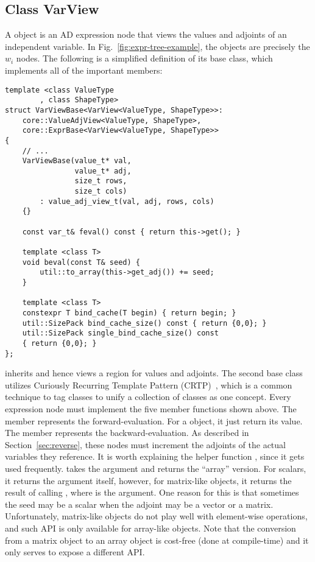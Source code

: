 \subsection{Class VarView}\label{ssec:var_view}

A  object is an AD expression node
that views the values and adjoints of an independent variable.
In Fig.~\ref{fig:expr-tree-example}, the  objects are precisely the $w_i$ nodes.
The following is a simplified definition of its base class, 
which implements all of the important members:
\begin{lstlisting}[style=customcpp]
template <class ValueType
        , class ShapeType>
struct VarViewBase<VarView<ValueType, ShapeType>>:
    core::ValueAdjView<ValueType, ShapeType>,
    core::ExprBase<VarView<ValueType, ShapeType>>
{
    // ...
    VarViewBase(value_t* val,
                value_t* adj,
                size_t rows,
                size_t cols)
        : value_adj_view_t(val, adj, rows, cols)
    {}

    const var_t& feval() const { return this->get(); }

    template <class T>
    void beval(const T& seed) { 
        util::to_array(this->get_adj()) += seed; 
    }

    template <class T>
    constexpr T bind_cache(T begin) { return begin; }
    util::SizePack bind_cache_size() const { return {0,0}; }
    util::SizePack single_bind_cache_size() const 
    { return {0,0}; }
};
\end{lstlisting}

 inherits  and hence views
a region for values and adjoints.
The second base class  utilizes Curiously Recurring Template Pattern (CRTP)~\cite{abrahams:2005},
which is a common technique to tag classes to unify a collection of classes as one concept.
Every expression node must implement the five member functions shown above.
The member  represents the forward-evaluation.
For a  object, it just return its value.
The member  represents the backward-evaluation.
As described in Section~\ref{sec:reverse}, 
these nodes must increment the adjoints of the actual variables they reference.
It is worth explaining 
the helper function ,
since it gets used frequently.
 takes the argument and returns the ``array'' version.
For scalars, it returns the argument itself,
however, for  matrix-like objects, 
it returns the result of calling , where  is the argument.
One reason for this is that sometimes the seed may be a scalar
when the adjoint may be a vector or a matrix.
Unfortunately,  matrix-like objects do not play well with element-wise operations,
and such API is only available for array-like objects.
Note that the conversion from a matrix object to an array object 
is cost-free (done at compile-time) and it only serves to expose a different API.\@

